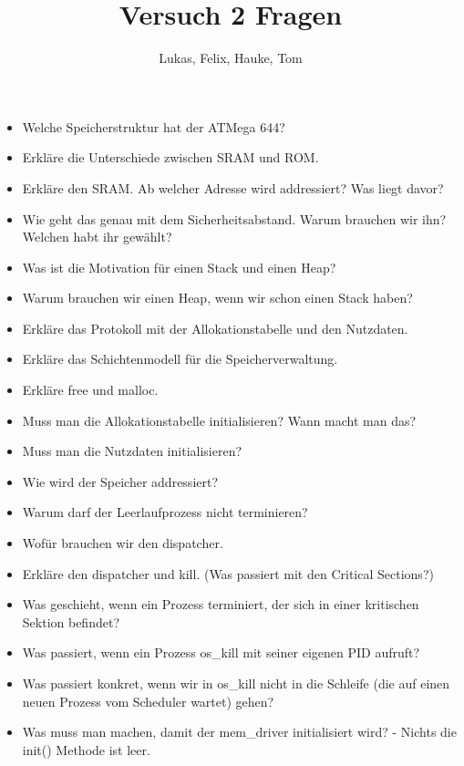 \documentclass[12pt]{article}
\title{Versuch 2 Fragen}
\author{Lukas, Felix, Hauke, Tom}
\begin{document}
\maketitle

\begin{itemize}
    \item Welche Speicherstruktur hat der ATMega 644? 
    \item Erkläre die Unterschiede zwischen SRAM und ROM.
    \item Erkläre den SRAM. Ab welcher Adresse wird addressiert? Was liegt davor?
    \item Wie geht das genau mit dem Sicherheitsabstand. Warum brauchen wir ihn? Welchen habt ihr gewählt?
    \item Was ist die Motivation für einen Stack und einen Heap?
    \item Warum brauchen wir einen Heap, wenn wir schon einen Stack haben?
    \item Erkläre das Protokoll mit der Allokationstabelle und den Nutzdaten.
    \item Erkläre das Schichtenmodell für die Speicherverwaltung.
    \item Erkläre free und malloc.
    \item Muss man die Allokationstabelle initialisieren? Wann macht man das?
    \item Muss man die Nutzdaten initialisieren?
    \item Wie wird der Speicher addressiert?
    \item Warum darf der Leerlaufprozess nicht terminieren?
    \item Wofür brauchen wir den dispatcher.
    \item Erkläre den dispatcher und kill. (Was passiert mit den Critical Sections?)
    \item Was geschieht, wenn ein Prozess terminiert, der sich in einer kritischen Sektion befindet?
    \item Was passiert, wenn ein Prozess os\_kill  mit seiner eigenen PID aufruft?
    \item Was passiert konkret, wenn wir in os\_kill nicht in die Schleife (die auf einen neuen Prozess vom Scheduler wartet) gehen?
    \item Was muss man machen, damit der mem\_driver initialisiert wird? - Nichts die init() Methode ist leer. 
\end{itemize}
\end{document}
